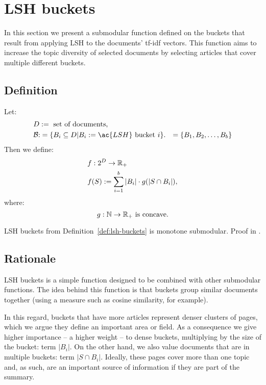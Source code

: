 \section{\ac{LSH} buckets}
\label{sec:lsh-buckets}

In this section we present a submodular function defined on the buckets that
result from applying \acl{LSH} to the documents' tf-idf vectors. This function
aims to increase the topic diversity of selected documents by selecting
articles that cover multiple different buckets.

\subsection{Definition}

\begin{definition}
  \label{def:lsh-buckets}
  Let:
  \begin{align*}
    &D := \text{ set of documents,} \\
    &\B
    \begin{aligned}[t]
      :&= \{B_i \subseteq D | B_i := \ac{LSH} \text{ bucket } i\}.
      &= \{B_1, B_2, \ldots, B_b\} \\
    \end{aligned}
  \end{align*}
  Then we define:
  \begin{align*}
    &f : 2^D \to \mathbb{R}_+ \\
    &f(S) := \sum_{i=1}^b |B_i| \cdot g(|S \cap B_i|),
  \end{align*}
  where:
    \[g : \mathbb{N} \to \mathbb{R}_+ \text{ is concave.}\]
\end{definition}

\begin{proposition}
  \label{prop:lsh-buckets}
  \ac{LSH} buckets from Definition~\ref{def:lsh-buckets} is monotone
  submodular. Proof in .
\end{proposition}

\subsection{Rationale}

\ac{LSH} buckets is a simple function designed to be combined with other
submodular functions. The idea behind this function is that buckets group
similar documents together (using a measure such as cosine similarity, for
example).

In this regard, buckets that have more articles represent denser clusters of
pages, which we argue they define an important area or field.
As a consequence we give higher importance -- a higher weight -- to dense
buckets, multiplying by the size of the bucket: term \(|B_i|\).
On the other hand, we also value documents that are in multiple buckets: term
\(|S \cap B_i|\).
Ideally, these pages cover more than one topic and, as such, are an important
source of information if they are part of the summary.

